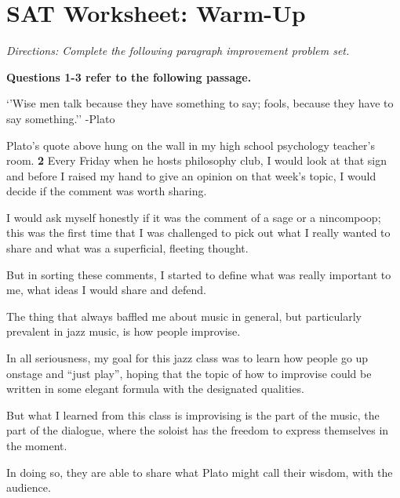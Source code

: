 \section{SAT Worksheet: Warm-Up}

\textit{Directions: Complete the following paragraph improvement problem set.}

\bigskip
\textbf{Questions 1-3 refer to the following passage.}

\begin{inparaenum}[\bfseries 1]
\item `'Wise men talk because they have something to say; fools, because they have to say something.''  -Plato

\item Plato's quote above hung on the wall in my high school psychology teacher's room. \textbf{2} Every Friday when he hosts philosophy club, I would look at that sign and before I raised my hand to give an opinion on that week's topic, I would decide if the comment was worth sharing. \item I would ask myself honestly if it was the comment of a sage or a nincompoop; this was the first time that I was challenged to pick out what I really wanted to share and what was a superficial, fleeting thought. \item But in sorting these comments, I started to define what was really important to me, what ideas I would share and defend.

\item The thing that always baffled me about music in general, but particularly prevalent in jazz music, is how people improvise. \item In all seriousness, my goal for this jazz class was to learn how people go up onstage and ``just play'', hoping that the topic of how to improvise could be written in some elegant formula with the designated qualities. \item But what I learned from this class is improvising is the part of the music, the part of the dialogue, where the soloist has the freedom to express themselves in the moment. \item In doing so, they are able to share what Plato might call their wisdom, with the audience.
\end{inparaenum}

